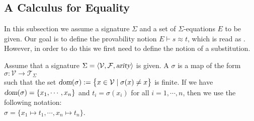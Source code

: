 \subsection{A Calculus for Equality}
In this subsection we assume a signature $\Sigma$ and a set of $\Sigma$-equations $E$ to be given.  
Our goal is to define the provability notion $E \vdash s \approx t$, which is read as .
However, in order to do this we first need to define 
the notion of a substitution.

\begin{Definition}
  Assume that a signature $\Sigma = \langle \mathcal{V}, \mathcal{F}, \textsl{arity} \rangle$ is given.
  A  $\sigma$ is a map of the form
  \\[0.2cm]
  \hspace*{1.3cm}
  $\sigma: \mathcal{V} \rightarrow \mathcal{T}_\Sigma$ 
  \\[0.2cm]
  such that the set $\textsl{dom}(\sigma) := \bigl\{ x \in \mathcal{V} \mid \sigma(x) \not= x \bigr\}$ is finite.
  If we have $\textsl{dom}(\sigma) = \{ x_1, \cdots, x_n \}$ and $t_i = \sigma(x_i)$ for all $i = 1, \cdots, n$,
  then we use the following notation:
  \\[0.2cm]
  \hspace*{1.3cm}
  $\sigma = \{ x_1 \mapsto t_1, \cdots, x_n \mapsto t_n \}$.   \eoxs
\end{Definition}

